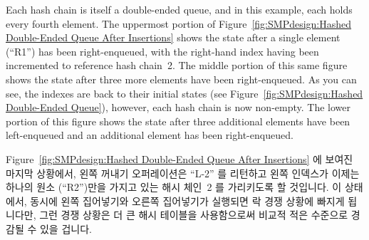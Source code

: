 Each hash chain is itself a double-ended queue, and in this example,
each holds every fourth element.
The uppermost portion of
Figure~\ref{fig:SMPdesign:Hashed Double-Ended Queue After Insertions}
shows the state after a single element (``R1'') has been
right-enqueued, with the right-hand index having been incremented to
reference hash chain~2.
The middle portion of this same figure shows the state after
three more elements have been right-enqueued.
As you can see, the indexes are back to their initial states
(see Figure~\ref{fig:SMPdesign:Hashed Double-Ended Queue}), however,
each hash chain is now non-empty.
The lower portion of this figure shows the state after three additional
elements have been left-enqueued and an additional element has been
right-enqueued.
\fi

Figure~\ref{fig:SMPdesign:Hashed Double-Ended Queue After Insertions} 에 보여진
마지막 상황에서, 왼쪽 꺼내기 오퍼레이션은 ``L-2'' 를 리턴하고 왼쪽 인덱스가
이제는 하나의 원소 (``R2'')만을 가지고 있는 해시 체인~2 를 가리키도록 할
것입니다.
이 상태에서, 동시에 왼쪽 집어넣기와 오른쪽 집어넣기가 실행되면 락 경쟁 상황에
빠지게 됩니다만, 그런 경쟁 상황은 더 큰 해시 테이블을 사용함으로써 비교적 적은
수준으로 경감될 수 있을 겁니다.

